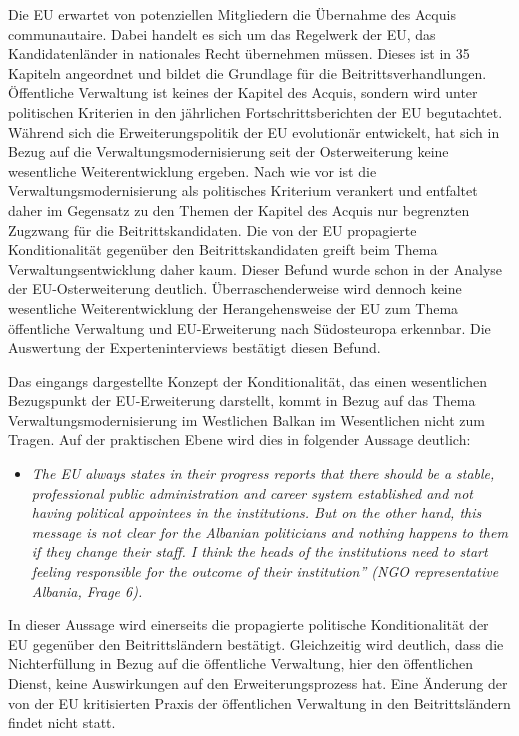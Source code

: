 Die EU erwartet von potenziellen Mitgliedern die Übernahme des Acquis communautaire. Dabei handelt es sich um das Regelwerk der EU, das Kandidatenländer in nationales Recht übernehmen müssen. Dieses ist in 35 Kapiteln angeordnet und bildet die Grundlage für die Beitrittsverhandlungen. Öffentliche Verwaltung ist keines der Kapitel des Acquis, sondern wird unter politischen Kriterien in den jährlichen Fortschrittsberichten der EU begutachtet. Während sich die Erweiterungspolitik der EU evolutionär entwickelt, hat sich in Bezug auf die Verwaltungsmodernisierung seit der Osterweiterung keine wesentliche Weiterentwicklung ergeben. Nach wie vor ist die Verwaltungsmodernisierung als politisches Kriterium verankert und entfaltet daher im Gegensatz zu den Themen der Kapitel des Acquis nur begrenzten Zugzwang für die Beitrittskandidaten. Die von der EU propagierte Konditionalität gegenüber den Beitrittskandidaten greift beim Thema Verwaltungsentwicklung daher kaum. Dieser Befund wurde schon in der Analyse der EU-Osterweiterung deutlich. Überraschenderweise wird dennoch keine wesentliche Weiterentwicklung der Herangehensweise der EU zum Thema öffentliche Verwaltung und EU-Erweiterung nach Südosteuropa erkennbar. Die Auswertung der Experteninterviews bestätigt diesen Befund.\par
Das eingangs dargestellte Konzept der Konditionalität, das einen wesentlichen Bezugspunkt der EU-Erweiterung darstellt, kommt in Bezug auf das Thema Verwaltungsmodernisierung im Westlichen Balkan im Wesentlichen nicht zum Tragen. Auf der praktischen Ebene wird dies in folgender Aussage deutlich:
\begin{itemize}[label={}]
\item \textit{The EU always states in their progress reports that there should be a stable, professional public administration and career system established and not having political appointees in the institutions. But on the other hand, this message is not clear for the Albanian politicians and nothing happens to them if they change their staff. I think the heads of the institutions need to start feeling responsible for the outcome of their institution” (NGO representative Albania, Frage 6).}
\end{itemize}
In dieser Aussage wird einerseits die propagierte politische Konditionalität der EU gegenüber den Beitrittsländern bestätigt. Gleichzeitig wird deutlich, dass die Nichterfüllung in Bezug auf die öffentliche Verwaltung, hier den öffentlichen Dienst, keine Auswirkungen auf den Erweiterungsprozess hat. Eine Änderung der von der EU kritisierten Praxis der öffentlichen Verwaltung in den Beitrittsländern findet nicht statt.\par
